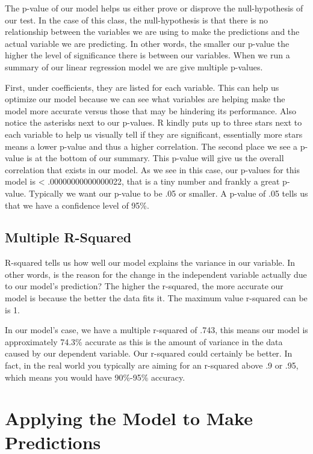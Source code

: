 \documentclass[
]{book}
\begin{document}
The p-value of our model helps us either prove or disprove the null-hypothesis of our test. In the case of this class, the null-hypothesis is that there is no relationship between the variables we are using to make the predictions and the actual variable we are predicting. In other words, the smaller our p-value the higher the level of significance there is between our variables. When we run a summary of our linear regression model we are give multiple p-values.

First, under coefficients, they are listed for each variable. This can help us optimize our model because we can see what variables are helping make the model more accurate versus those that may be hindering its performance. Also notice the asterisks next to our p-values. R kindly puts up to three stars next to each variable to help us visually tell if they are significant, essentially more stars means a lower p-value and thus a higher correlation.
The second place we see a p-value is at the bottom of our summary. This p-value will give us the overall correlation that exists in our model. As we see in this case, our p-values for this model is \textless{} .00000000000000022, that is a tiny number and frankly a great p-value. Typically we want our p-value to be .05 or smaller. A p-value of .05 tells us that we have a confidence level of 95\%.

\hypertarget{multiple-r-squared}{%
\subsection{Multiple R-Squared}\label{multiple-r-squared}}

R-squared tells us how well our model explains the variance in our variable. In other words, is the reason for the change in the independent variable actually due to our model's prediction? The higher the r-squared, the more accurate our model is because the better the data fits it. The maximum value r-squared can be is 1.

In our model's case, we have a multiple r-squared of .743, this means our model is approximately 74.3\% accurate as this is the amount of variance in the data caused by our dependent variable. Our r-squared could certainly be better. In fact, in the real world you typically are aiming for an r-squared above .9 or .95, which means you would have 90\%-95\% accuracy.

\hypertarget{applying-the-model-to-make-predictions}{%
\section{Applying the Model to Make Predictions}\label{applying-the-model-to-make-predictions}}
\end{document}
